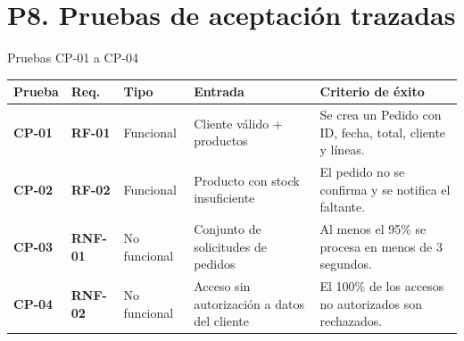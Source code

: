 \documentclass[11pt,a4paper]{article}
\begin{document}
\section*{P8. Pruebas de aceptación trazadas}
\begin{taskbox}{Pruebas CP-01 a CP-04}
\scriptsize
\begin{tabularx}{\textwidth}{>{\bfseries}p{1.5cm} >{\bfseries}p{1.6cm} p{2.1cm} X X}
\toprule
\textcolor{uteqblue}{Prueba} & \textcolor{uteqblue}{Req.} & \textcolor{uteqblue}{Tipo} & \textcolor{uteqblue}{Entrada} & \textcolor{uteqblue}{Criterio de éxito} \\
\midrule
CP-01 & RF-01 & Funcional & Cliente válido + productos & Se crea un Pedido con ID, fecha, total, cliente y líneas. \\
CP-02 & RF-02 & Funcional & Producto con stock insuficiente & El pedido no se confirma y se notifica el faltante. \\
CP-03 & RNF-01 & No funcional & Conjunto de solicitudes de pedidos & Al menos el 95\% se procesa en menos de 3 segundos. \\
CP-04 & RNF-02 & No funcional & Acceso sin autorización a datos del cliente & El 100\% de los accesos no autorizados son rechazados. \\
\bottomrule
\end{tabularx}
\normalsize
\end{taskbox}

\newpage
\end{document}
